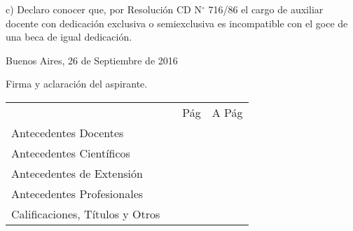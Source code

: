 \documentclass{article}
\newcommand{\fecha}[3]{#1 de #2 de #3}
\begin{document}
\noindent c) Declaro conocer que, por Resoluci\'on CD N$^\circ$ 716/86 el cargo de auxiliar docente con dedicaci\'on exclusiva o semiexclusiva es incompatible con el goce de una beca de igual dedicaci\'on.


\bigskip
\bigskip
\bigskip
\bigskip

\noindent Buenos Aires, \fecha{26}{Septiembre}{2016}

\bigskip
\bigskip
\bigskip

\noindent \hdashrule{6cm}{0.5pt}{0.75pt}

\noindent Firma y aclaraci\'on del aspirante.

\newpage


\bigskip
\bigskip

\noindent \begin{tabular}{lccc}

\vspace{0.3cm}

 &\hspace{2cm} &\textrm{\hspace{0.5cm} P\'ag \hspace{0.5cm}} & \textrm{\hspace{0.5cm} A P\'ag \hspace{0.5cm}} \\

\vspace{0.1cm}

\textrm{Antecedentes Docentes}& & ~\pageref{begin-docentes} & ~\pageref{end-docentes} \\

\vspace{0.1cm}

\textrm{Antecedentes Cient\'ificos}& & ~\pageref{begin-cientificos} & ~\pageref{end-cientificos} \\

\vspace{0.1cm}

\textrm{Antecedentes de Extensi\'on}& & ~\pageref{begin-extension} & ~\pageref{end-extension} \\

\vspace{0.1cm}

\textrm{Antecedentes Profesionales}& & ~\pageref{begin-profesionales} & ~\pageref{end-profesionales} \\

\vspace{0.1cm}

\textrm{Calificaciones, T\'itulos y Otros}& & ~\pageref{begin-otros} & ~\pageref{end-otros} \\

\end{tabular}
\end{document}
